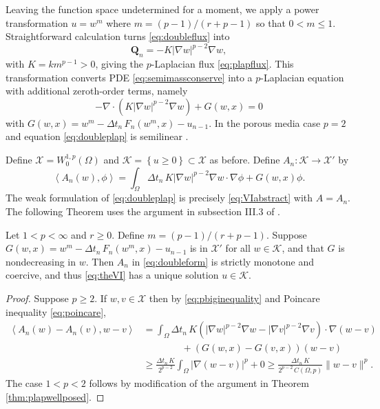 \documentclass[final,onefignum]{siamart190516}
\newcommand\bQ{\mathbf{Q}}
\newcommand{\Div}{\nabla\cdot}
\newcommand{\grad}{\nabla}
\newcommand{\ip}[2]{\ensuremath{\left<#1,#2\right>}}
\begin{document}
Leaving the function space undetermined for a moment, we apply a power transformation $u = w^m$ where $m = (p-1)/(r+p-1)$ \cite{Raviart1970} so that $0 < m \le 1$.  Straightforward calculation turns \eqref{eq:doubleflux} into
\begin{equation}
	\bQ_n = - K |\grad w|^{p-2} \grad w, \label{eq:doublenewflux}
\end{equation}
with $K=k m^{p-1}>0$, giving the $p$-Laplacian flux \eqref{eq:plapflux}.  This transformation converts PDE \eqref{eq:semimassconserve} into a $p$-Laplacian equation with additional zeroth-order terms, namely
\begin{equation}
    - \Div\left(K|\grad w|^{p-2} \grad w\right) + G(w,x) = 0  \label{eq:doubleplap}
\end{equation}
with $G(w,x) = w^m - \Delta t_n\, F_n(w^m,x) - u_{n-1}$.  In the porous media case $p=2$ and equation \eqref{eq:doubleplap} is semilinear \cite{Evans2010}.

Define $\mathcal{X} = W_0^{1,p}(\Omega)$ and $\mathcal{K} =\left\{u\ge 0\right\} \subset \mathcal{X}$ as before.  Define $A_n: \mathcal{K} \to \mathcal{X}'$ by
\begin{equation}
\ip{A_n(w)}{\phi} = \int_\Omega \Delta t_n\, K |\grad w|^{p-2} \grad w\cdot \grad \phi + G(w,x)\phi. \label{eq:doubleform}
\end{equation}
The weak formulation of \eqref{eq:doubleplap} is precisely \eqref{eq:VIabstract} with $A=A_n$.  The following Theorem uses the argument in subsection III.3 of \cite{KinderlehrerStampacchia1980}.

\begin{theorem}
Let $1<p<\infty$ and $r\ge 0$.  Define $m = (p-1)/(r+p-1)$.  Suppose $G(w,x)=w^m - \Delta t_n\, F_n(w^m,x) - u_{n-1}$ is in $\mathcal{X}'$ for all $w\in\mathcal{K}$, and that $G$ is nondecreasing in $w$.  Then $A_n$ in \eqref{eq:doubleform} is strictly monotone and coercive, and thus \eqref{eq:theVI} has a unique solution $u\in\mathcal{K}$.
\end{theorem}

\begin{proof}
Suppose $p\ge 2$.  If $w,v\in\mathcal{X}$ then by \eqref{eq:pbiginequality} and Poincare inequality \eqref{eq:poincare},
\begin{align*}
\ip{A_n(w)-A_n(v)}{w-v} &= \int_\Omega \Delta t_n\, K \left(|\grad w|^{p-2} \grad w - |\grad v|^{p-2} \grad v\right) \cdot \grad (w-v) \\
  &\qquad\qquad + \left(G(w,x) - G(v,x)\right) (w-v) \\
  &\ge \frac{\Delta t_n\,K}{2^{p-2}} \int_\Omega |\grad (w-v)|^p + 0 \ge \frac{\Delta t_n\,K}{2^{p-2}\, C(\Omega,p)} \|w-v\|^p.
\end{align*}
The case $1<p<2$ follows by modification of the argument in Theorem \ref{thm:plapwellposed}.
\end{proof}
\end{document}

